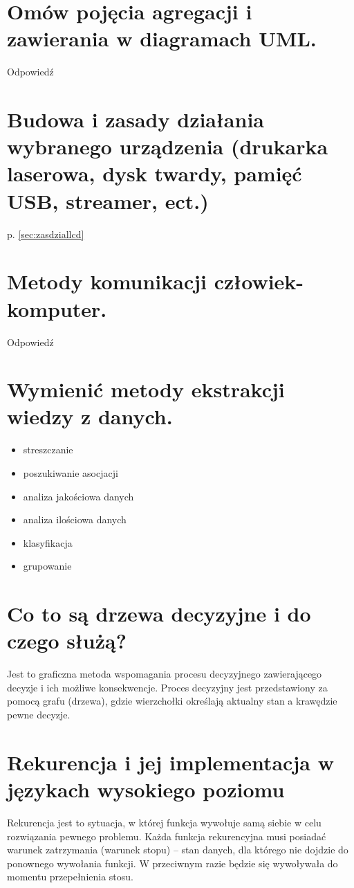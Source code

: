 \documentclass[12pt,a4paper]{article}
\begin{document}
	\section{Omów pojęcia agregacji i zawierania w diagramach UML.}
	Odpowiedź

	\section{Budowa i zasady działania wybranego urządzenia (drukarka laserowa, dysk twardy, pamięć USB, streamer, ect.)}
	p. \ref{sec:zasdziallcd}

	\section{Metody komunikacji człowiek-komputer.}
	Odpowiedź

	\section{Wymienić metody ekstrakcji wiedzy z danych.}
	\begin{itemize}
		\item streszczanie
		\item poszukiwanie asocjacji
		\item analiza jakościowa danych
		\item analiza ilościowa danych
		\item klasyfikacja
		\item grupowanie
	\end{itemize}

	\section{Co to są drzewa decyzyjne i do czego służą?}
	Jest to graficzna metoda wspomagania procesu decyzyjnego zawierającego decyzje i ich możliwe konsekwencje. Proces decyzyjny jest przedstawiony za pomocą grafu (drzewa), gdzie wierzchołki określają aktualny stan a krawędzie pewne decyzje.

	\section{Rekurencja i jej implementacja w językach wysokiego poziomu}
	Rekurencja jest to sytuacja, w której funkcja wywołuje samą siebie w celu rozwiązania pewnego problemu. Każda funkcja rekurencyjna musi posiadać warunek zatrzymania (warunek stopu) – stan danych, dla którego nie dojdzie do ponownego wywołania funkcji. W przeciwnym razie będzie się wywoływała do momentu przepełnienia stosu.
\end{document}
